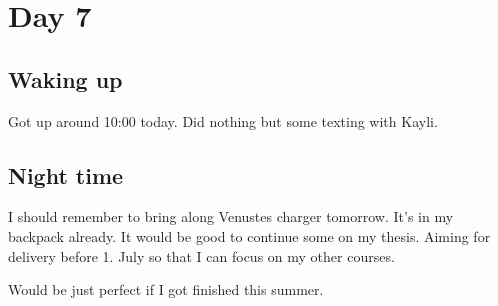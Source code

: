 \section{Day 7}
\subsection{Waking up}
Got up around 10:00 today.
Did nothing but some texting with Kayli.

\subsection{Night time}
I should remember to bring along Venustes charger tomorrow. It's in my backpack already.
It would be good to continue some on my thesis. Aiming for delivery before 1. July so that I can focus on my other courses.

Would be just perfect if I got finished this summer.
